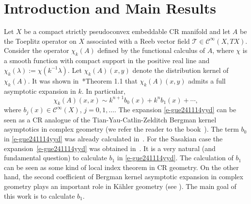 \documentclass[12pt]{amsart}
\theoremstyle{definition}
\theoremstyle{named}
\numberwithin{equation}{subsection}
\def\cC{\mathscr{C}}
\begin{document}
\tableofcontents
\section{Introduction and Main Results} \label{s-gue241206yyd}
{\tiny{{\color{white}{\subsection{ }}}}}
Let $X$ be a compact strictly pseudoconvex embeddable 
CR manifold and let
$A$ be the Toeplitz operator on $X$ associated with a Reeb vector field $\mathcal{T}\in\cC^\infty(X,TX)$. Consider the operator $\chi_k(A)$ 
defined by the functional
calculus of $A$, where $\chi$ is a smooth function
with compact support in the positive real line and 
$\chi_k(\lambda):=\chi(k^{-1}\lambda)$. Let $\chi_k(A)(x,y)$ denote the distribution kernel of $\chi_k(A)$. It was shown in~\cite{HHMS23}*{Theorem 1.1} that $\chi_k(A)(x,y)$ admits a full asymptotic expansion in $k$. In particular, 
\begin{equation}\label{e-gue241114yyd}
\chi_k(A)(x,x)\sim k^{n+1}b_0(x)+k^nb_1(x)+\cdots,
\end{equation}
where $b_j(x)\in\mathcal{C}^\infty(X)$, $j=0,1,\ldots$. The expansion \eqref{e-gue241114yyd} can be seen as a CR analogue of the Tian-Yau-Catlin-Zelditch Bergman kernel asymptotics in complex geometry (we refer the reader to the book~\cite{Ma_Marinescu_HMI_BKE_2007}). The term $b_0$ in \eqref{e-gue241114yyd} was already calculated in~\cite{HHMS23}. For the Sasakian case the expansion~\eqref{e-gue241114yyd} was obtained in~\cite{Herrmann_Hsiao_Li_T_equivariant_Szego_2020}. It is a very natural (and fundamental question) to calculate $b_1$ in \eqref{e-gue241114yyd}. The calculation of $b_1$ can be seen as some kind of local index theorem in CR geometry. On the other hand, the second coefficient of Bergman kernel asymptotic expansion in complex geometry plays an important role in K\"ahler geometry (see \cite{Ma_Marinescu_HMI_BKE_2007}). 
The main goal of this work is to calculate $b_1$. 
 
\end{document}
